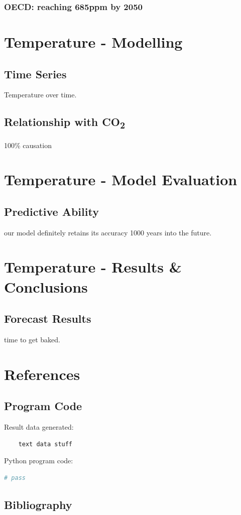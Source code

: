 \documentclass[12pt]{mcmthesis}
\begin{document}
    \subsubsection*{OECD: reaching 685ppm by 2050}


    \section{Temperature - Modelling}

    \subsection{Time Series}
    Temperature over time.


    \subsection{Relationship with CO\textsubscript{2}}
    100\% causation



    \section{Temperature - Model Evaluation}

    \subsection{Predictive Ability}
    our model definitely retains its accuracy 1000 years into the future.



    \section{Temperature - Results \& Conclusions}

    \subsection{Forecast Results}
    time to get baked.



    \section{References}

    \subsection{Program Code}
    \noindent Result data generated:
    \begin{verbatim}
    text data stuff

    \end{verbatim}

    \noindent Python program code:
    \begin{lstlisting}[language=Python]
        # pass

    \end{lstlisting}


    \subsection{Bibliography}
\end{document}

